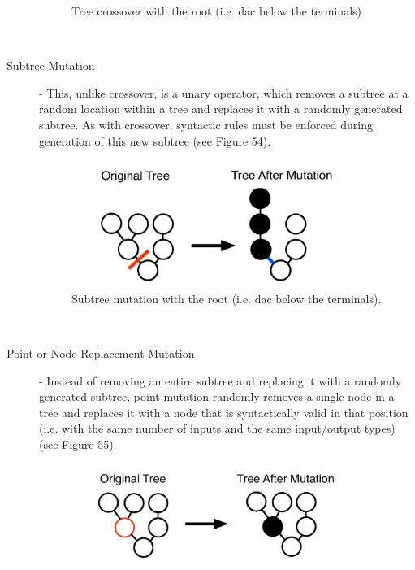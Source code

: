 \documentclass[12pt]{report} 	%
\numberwithin{figure}{chapter}
\numberwithin{table}{chapter}
\numberwithin{equation}{chapter}
\begin{document}
\begin{flushleft}
\begin{description}
\begin{figure}[h!]
\begin{center}
\caption[Crossover]{Tree crossover with the root (i.e. dac\texttildelow{} below the terminals).}
\end{center}
\end{figure}
\clearpage
\\
\item[Subtree Mutation] - This, unlike crossover, is a unary operator, which removes a subtree at a random location within a tree and replaces it with a randomly generated subtree. As with crossover, syntactic rules must be enforced during generation of this new subtree (see Figure 54).
\begin{figure}[h!]
\vspace{24pt}
\begin{center}
\includegraphics[scale=0.5]{SubtreeMutation}
\caption[Subtree mutation]{Subtree mutation with the root (i.e. dac\texttildelow{} below the terminals).}
\end{center}
\end{figure}
\\
\item[Point or Node Replacement Mutation] - Instead of removing an entire subtree and replacing it with a randomly generated subtree, point mutation randomly removes a single node in a tree and replaces it with a node that is syntactically valid in that position (i.e. with the same number of inputs and the same input/output types) (see Figure 55).
\begin{figure}[h!]
\vspace{24pt}
\begin{center}
\includegraphics[scale=0.5]{PointMutation}

\end{center}
\end{figure}
\end{description}
\end{flushleft}
\end{document}
